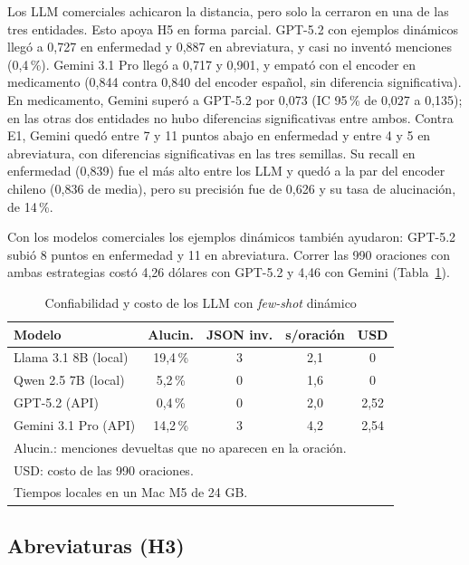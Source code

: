 \documentclass[10pt,journal,a4paper]{IEEEtran}
\begin{document}
Los LLM comerciales achicaron la distancia, pero solo la cerraron en una de las tres entidades. Esto apoya H5 en forma parcial. GPT-5.2 con ejemplos dinámicos llegó a 0,727 en enfermedad y 0,887 en abreviatura, y casi no inventó menciones (0,4\,\%). Gemini 3.1 Pro llegó a 0,717 y 0,901, y empató con el encoder en medicamento (0,844 contra 0,840 del encoder español, sin diferencia significativa). En medicamento, Gemini superó a GPT-5.2 por 0,073 (IC 95\,\% de 0,027 a 0,135); en las otras dos entidades no hubo diferencias significativas entre ambos. Contra E1, Gemini quedó entre 7 y 11 puntos abajo en enfermedad y entre 4 y 5 en abreviatura, con diferencias significativas en las tres semillas. Su recall en enfermedad (0,839) fue el más alto entre los LLM y quedó a la par del encoder chileno (0,836 de media), pero su precisión fue de 0,626 y su tasa de alucinación, de 14\,\%.

Con los modelos comerciales los ejemplos dinámicos también ayudaron: GPT-5.2 subió 8 puntos en enfermedad y 11 en abreviatura. Correr las 990 oraciones con ambas estrategias costó 4,26 dólares con GPT-5.2 y 4,46 con Gemini (Tabla~\ref{tab:costos}).

\begin{table}[!t]
\centering
\caption{Confiabilidad y costo de los LLM con \emph{few-shot} din\'amico}
\label{tab:costos}
\setlength{\tabcolsep}{3pt}
\small
\begin{tabular}{lcccc}
\toprule
Modelo & Alucin. & JSON inv. & s/oración & USD \\
\midrule
Llama 3.1 8B (local) & 19,4\,\% & 3 & 2,1 & 0 \\
Qwen 2.5 7B (local) & 5,2\,\% & 0 & 1,6 & 0 \\
GPT-5.2 (API) & 0,4\,\% & 0 & 2,0 & 2,52 \\
Gemini 3.1 Pro (API) & 14,2\,\% & 3 & 4,2 & 2,54 \\
\bottomrule
\multicolumn{5}{l}{\footnotesize Alucin.: menciones devueltas que no aparecen en la oración.}\\
\multicolumn{5}{l}{\footnotesize USD: costo de las 990 oraciones.}\\
\multicolumn{5}{l}{\footnotesize Tiempos locales en un Mac M5 de 24 GB.}
\end{tabular}
\end{table}

\subsection{Abreviaturas (H3)}
\end{document}
